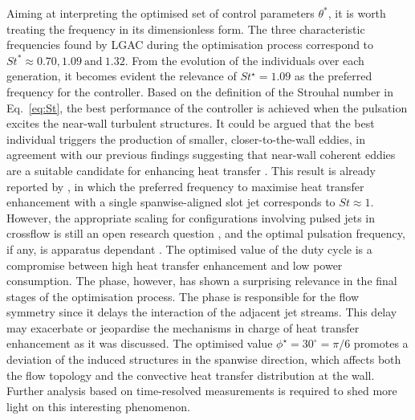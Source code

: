 Aiming at interpreting the optimised set of control parameters $\theta^*$, it is worth treating the frequency in its dimensionless form. The three characteristic frequencies found by LGAC during the optimisation process correspond to $St^* \approx 0.70, 1.09~\text{and}~1.32$. From the evolution of the individuals over each generation, it becomes evident the relevance of $St^\star = 1.09$ as the preferred frequency for the controller. Based on the definition of the Strouhal number in Eq.~\eqref{eq:St}, the best performance of the controller is achieved when the pulsation excites the near-wall turbulent structures. It could be argued that the best individual triggers the production of smaller, closer-to-the-wall eddies, in agreement with our previous findings suggesting that near-wall coherent eddies are a suitable candidate for enhancing heat transfer \citep{mallor2019modal}. This result is already reported by \citet{Castellanos2022slotjet}, in which the preferred frequency to maximise heat transfer enhancement with a single spanwise-aligned slot jet corresponds to $St \approx 1$. However, the appropriate scaling for configurations involving pulsed jets in crossflow is still an open research question \citep{Sau2010optJICF}, and the optimal pulsation frequency, if any, is apparatus dependant \citep{MCLOSKEY2002}.
The optimised value of the duty cycle is a compromise between high heat transfer enhancement and low power consumption. The phase, however, has shown a surprising relevance in the final stages of the optimisation process. The phase is responsible for the flow symmetry since it delays the interaction of the adjacent jet streams. This delay may exacerbate or jeopardise the mechanisms in charge of heat transfer enhancement as it was discussed. The optimised value $\phi^\star = 30^\circ = \pi/6$ promotes a deviation of the induced structures in the spanwise direction, which affects both the flow topology and the convective heat transfer distribution at the wall. Further analysis based on time-resolved measurements is required to shed more light on this interesting phenomenon.



